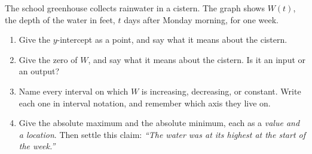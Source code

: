 \documentclass[10pt]{article}
\begin{document}
\boxguard[30]
\begin{practicebox}
\small
The school greenhouse collects rainwater in a cistern. The graph shows $W(t)$, the depth of the
water in feet, $t$ days after Monday morning, for one week.

\begin{center}
\end{center}

\begin{enumerate}[leftmargin=1.6em, itemsep=6pt, topsep=2pt]
  \item Give the $y$-intercept as a point, and say what it means about the cistern.


  \item Give the zero of $W$, and say what it means about the cistern. Is it an input or an output?


  \item Name every interval on which $W$ is increasing, decreasing, or constant. Write each one in
        interval notation, and remember which axis they live on.


  \item Give the absolute maximum and the absolute minimum, each as a \emph{value and a location}.
        Then settle this claim: \emph{``The water was at its highest at the start of the week.''}

\end{enumerate}
\end{practicebox}
\end{document}
